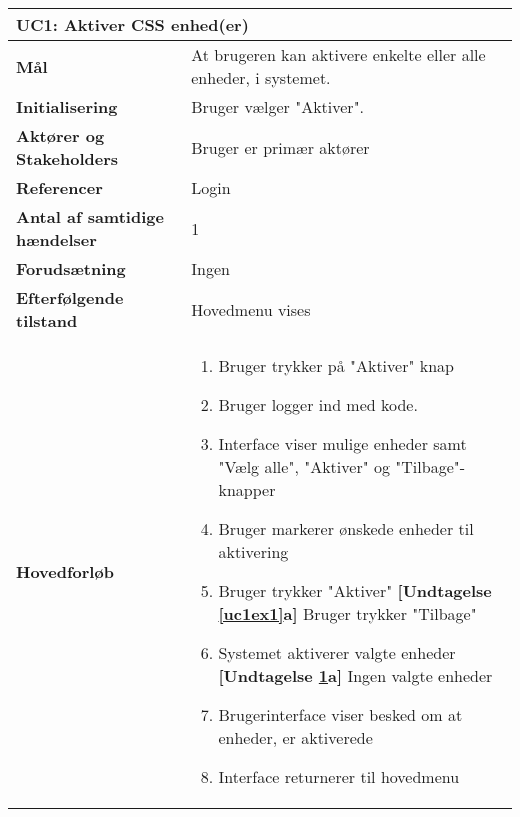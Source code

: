 \begin{table}[H] \centering
	\begin{tabular} {|p{6cm}|p{8cm}|}
	\hline
		\multicolumn{2}{|l|}{\textbf{UC1: Aktiver CSS enhed(er)}} \\\hline
		
		\textbf{Mål}							&At brugeren kan aktivere enkelte eller alle enheder, i systemet.	\\\hline
		\textbf{Initialisering}				&Bruger vælger "Aktiver". 								\\\hline
		\textbf{Aktører og Stakeholders}		&Bruger er primær aktører 							\\\hline
		\textbf{Referencer}					&Login														\\\hline
		\textbf{Antal af samtidige hændelser}&1 																\\\hline
		\textbf{Forudsætning}				&Ingen														\\\hline
		\textbf{Efterfølgende tilstand}		&Hovedmenu vises 								\\\hline
		\textbf{Hovedforløb}					
			&\begin{enumerate}
	
				\item Bruger trykker på "Aktiver" knap
				
				\item Bruger logger ind med kode.
										
				\item Interface viser mulige enheder samt "Vælg alle", "Aktiver" og "Tilbage"-knapper
												
				\item \label{uc1select} Bruger markerer ønskede enheder til aktivering
												
				\item \label{uc1ex1} Bruger trykker "Aktiver"\newline
					\textbf{[Undtagelse \ref{uc1ex1}a]} Bruger trykker "Tilbage"
												
				\item \label{uc1ex2} Systemet aktiverer valgte enheder\newline
					\textbf{[Undtagelse \ref{uc1ex2}a]} Ingen valgte enheder
				
				\item Brugerinterface viser besked om at enheder, er aktiverede
																	
				\item Interface returnerer til hovedmenu
												

\end{enumerate}
\end{tabular}
\end{table}
